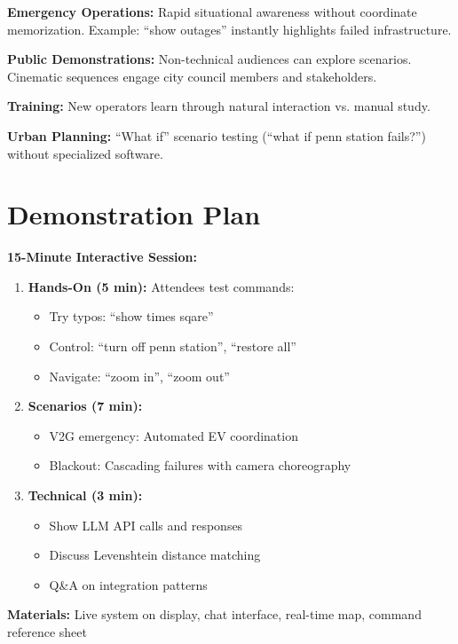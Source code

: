 \documentclass[sigconf]{acmart}
\begin{document}
\textbf{Emergency Operations:} Rapid situational awareness without coordinate memorization. Example: ``show outages'' instantly highlights failed infrastructure.

\textbf{Public Demonstrations:} Non-technical audiences can explore scenarios. Cinematic sequences engage city council members and stakeholders.

\textbf{Training:} New operators learn through natural interaction vs. manual study.

\textbf{Urban Planning:} ``What if'' scenario testing (``what if penn station fails?'') without specialized software.

\section{Demonstration Plan}

\textbf{15-Minute Interactive Session:}

\begin{enumerate}
    \item \textbf{Hands-On (5 min):} Attendees test commands:
        \begin{itemize}
            \item Try typos: ``show times sqare''
            \item Control: ``turn off penn station'', ``restore all''
            \item Navigate: ``zoom in'', ``zoom out''
        \end{itemize}
    \item \textbf{Scenarios (7 min):}
        \begin{itemize}
            \item V2G emergency: Automated EV coordination
            \item Blackout: Cascading failures with camera choreography
        \end{itemize}
    \item \textbf{Technical (3 min):}
        \begin{itemize}
            \item Show LLM API calls and responses
            \item Discuss Levenshtein distance matching
            \item Q\&A on integration patterns
        \end{itemize}
\end{enumerate}

\textbf{Materials:} Live system on display, chat interface, real-time map, command reference sheet
\end{document}
